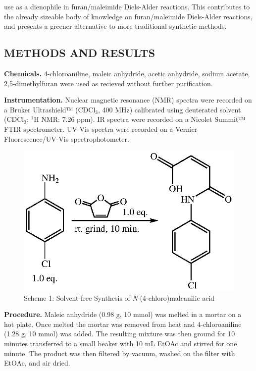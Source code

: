 \documentclass[11pt]{article}
\let\bf\textbf
\begin{document}
use as a dienophile in furan/maleimide Diels-Alder reactions. This contributes to the already sizeable body of knowledge on furan/maleimide Diels-Alder reactions, and presents a greener alternative to more traditional synthetic methods. 

\subsection*{METHODS AND RESULTS}
\bf{Chemicals.} 4-chloroaniline, maleic anhydride, acetic anhydride, sodium acetate, 2,5-dimethylfuran were used as recieved without further purification.

\bf{Instrumentation.} Nuclear magnetic resonance (NMR) spectra were recorded on a Bruker Ultrashield™ (CDCl$_3$, 400 MHz) calibrated using deuterated solvent (CDCl$_3$: $^1$H NMR: 7.26 ppm). IR spectra were recorded on a Nicolet Summit™ FTIR spectrometer. UV-Vis spectra were recorded on a Vernier Fluorescence/UV-Vis spectrophotometer.

\begin{figure}[H]
    \centering
    \includegraphics[scale=0.8]{schemes/scheme1.eps}
    \caption*{Scheme 1: Solvent-free Synthesis of \textit{N}-(4-chloro)maleanilic acid}
\end{figure}

\bf{Procedure.} Maleic anhydride (0.98 g, 10 mmol) was melted in a mortar on a hot plate. Once melted the mortar was removed from heat and 4-chloroaniline (1.28 g, 10 mmol) was added. The resulting mixture was then ground for 10 minutes transferred to a small beaker with 10 mL EtOAc and stirred for one minute. The product was then filtered by vacuum, washed on the filter with EtOAc, and air dried.
\end{document}
